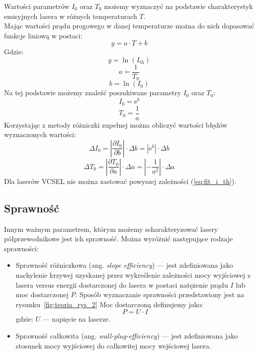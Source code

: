 Wartości parametrów $I_0$ oraz $T_0$ możemy wyznaczyć na podstawie charakterystyk
emisyjnych lasera w różnych temperaturach $T$. \\
Mając wartości prądu progowego w danej temperaturze  można do nich dopasować funkcje liniową w postaci:
\begin{equation}
y = a \cdot T + b
\end{equation}
Gdzie:
\begin{equation}
y = \ln(I_{\mathrm{th}})
\end{equation}
\begin{equation}
a = \frac{1}{T_0}
\end{equation}
\begin{equation}
b = \ln(I_0)
\end{equation}
Na tej podstawie możemy znaleźć poszukiwane parametry $I_0$ oraz $T_0$:
\begin{equation}
I_0 = \mathrm{e}^b
\end{equation}
\begin{equation}
T_0 = \frac{1}{a}
\end{equation}
Korzystając z metody różniczki zupełnej można obliczyć wartości błędów wyznaczonych wartości:
\begin{equation}
\Delta I_0 = \left\lvert \frac{\partial I_{0}}{\partial b} \right\rvert \cdot \Delta b = | \mathrm{e}^b | \cdot \Delta b
\end{equation}
\begin{equation}
\Delta T_0 = \left\lvert \frac{\partial T_{0}}{\partial a} \right\rvert \cdot \Delta a = \left\lvert -\frac{1}{a^2} \right\rvert \cdot \Delta a
\end{equation}
Dla laserów VCSEL nie można zastować powyszej zależności (\ref{eq:fit_i_th}).
\subsection{Sprawność}
Innym ważnym parametrem, którym możemy scharakteryzować lasery półprzewodnikowe jest ich sprawność. Można wyróżnić następujące rodzaje sprawności:
\begin{itemize}
\item Sprawność różniczkowa (ang. \textit{slope efficiency}) --- jest zdefiniowana jako nachylenie krzywej uzyskanej przez wykreślenie zależności
mocy wyjściowej z lasera versus energii dostarczonej do lasera w postaci natężenie prądu $I$ lub moc dostarczonej $P$. Sposób wyznaczanie sprawności
przedstawiony jest na rysunku~\ref{fig:teoria_rys_2}
Moc dostarczoną definujemy jako:
\begin{equation}
P = U \cdot I
\end{equation}
gdzie: $U$ --- napięcie na laserze.
\item Sprawność całkowita (ang. \textit{wall-plug-efficiency}) --- jest zdefiniowana jako stosunek mocy wyjściowej do całkowitej mocy wejściowej lasera.
\end{itemize}
